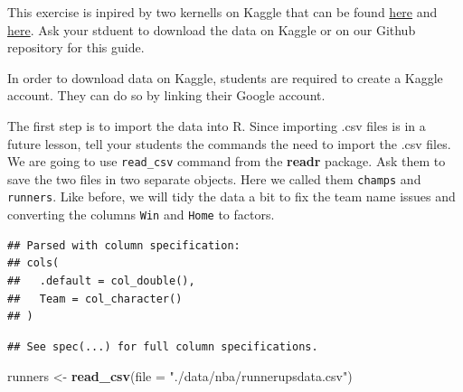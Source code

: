 \documentclass[]{book}
\newenvironment{Shaded}{\begin{snugshade}}{\end{snugshade}}
\newcommand{\CommentTok}[1]{\textcolor[rgb]{0.56,0.35,0.01}{\textit{#1}}}
\newcommand{\DataTypeTok}[1]{\textcolor[rgb]{0.13,0.29,0.53}{#1}}
\newcommand{\KeywordTok}[1]{\textcolor[rgb]{0.13,0.29,0.53}{\textbf{#1}}}
\newcommand{\NormalTok}[1]{#1}
\newcommand{\OperatorTok}[1]{\textcolor[rgb]{0.81,0.36,0.00}{\textbf{#1}}}
\newcommand{\OtherTok}[1]{\textcolor[rgb]{0.56,0.35,0.01}{#1}}
\newcommand{\StringTok}[1]{\textcolor[rgb]{0.31,0.60,0.02}{#1}}
\begin{document}
This exercise is inpired by two kernells on Kaggle that can be found \href{https://www.kaggle.com/carterallen/nba-championship-data}{here} and \href{https://www.kaggle.com/daverosenman/nba-finals-three-point-stats-1980-2017}{here}. Ask your stduent to download the data on Kaggle or on our Github repository for this guide.

In order to download data on Kaggle, students are required to create a Kaggle account. They can do so by linking their Google account.

The first step is to import the data into R. Since importing .csv files is in a future lesson, tell your students the commands the need to import the .csv files. We are going to use \texttt{read\_csv} command from the \textbf{readr} package. Ask them to save the two files in two separate objects. Here we called them \texttt{champs} and \texttt{runners}. Like before, we will tidy the data a bit to fix the team name issues and converting the columns \texttt{Win} and \texttt{Home} to factors.

\begin{Shaded}
\end{Shaded}

\begin{verbatim}
## Parsed with column specification:
## cols(
##   .default = col_double(),
##   Team = col_character()
## )
\end{verbatim}

\begin{verbatim}
## See spec(...) for full column specifications.
\end{verbatim}

\begin{Shaded}
\begin{Highlighting}[]
\NormalTok{runners <-}\StringTok{ }\KeywordTok{read_csv}\NormalTok{(}\DataTypeTok{file =} \StringTok{"./data/nba/runnerupsdata.csv"}\NormalTok{)}
\end{Highlighting}
\end{Shaded}
\end{document}
